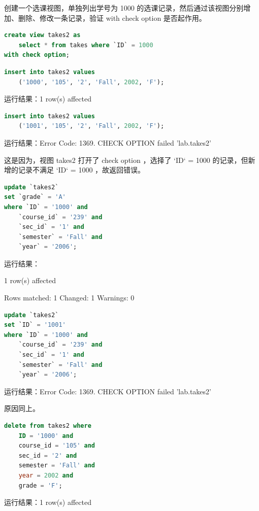 \documentclass{article}
\begin{document}
创建一个选课视图，单独列出学号为 1000 的选课记录，然后通过该视图分别增加、删除、修改一条记录，验证 with check option 是否起作用。

\begin{lstlisting}[language=sql]
create view takes2 as
	select * from takes where `ID` = 1000
with check option;
\end{lstlisting}


\begin{lstlisting}[language=sql]
insert into takes2 values
	('1000', '105', '2', 'Fall', 2002, 'F');
\end{lstlisting}

运行结果：1 row(s) affected

\begin{lstlisting}[language=sql]
insert into takes2 values
	('1001', '105', '2', 'Fall', 2002, 'F');
\end{lstlisting}

运行结果：Error Code: 1369. CHECK OPTION failed 'lab.takes2'

这是因为，视图 takes2 打开了 check option ，选择了 `ID` = 1000 的记录，但新增的记录不满足 `ID` = 1000 ，故返回错误。

\begin{lstlisting}[language=sql]
update `takes2`
set `grade` = 'A'
where `ID` = '1000' and
	`course_id` = '239' and
    `sec_id` = '1' and
    `semester` = 'Fall' and
    `year` = '2006';
\end{lstlisting}

运行结果：

1 row(s) affected

Rows matched: 1  Changed: 1  Warnings: 0

\begin{lstlisting}[language=sql]
update `takes2`
set `ID` = '1001'
where `ID` = '1000' and
	`course_id` = '239' and
    `sec_id` = '1' and
    `semester` = 'Fall' and
    `year` = '2006';
\end{lstlisting}

运行结果：Error Code: 1369. CHECK OPTION failed 'lab.takes2'

原因同上。

\begin{lstlisting}[language=sql]
delete from takes2 where
	ID = '1000' and
    course_id = '105' and
    sec_id = '2' and
    semester = 'Fall' and
    year = 2002 and
    grade = 'F';
\end{lstlisting}

运行结果：1 row(s) affected
\end{document}
